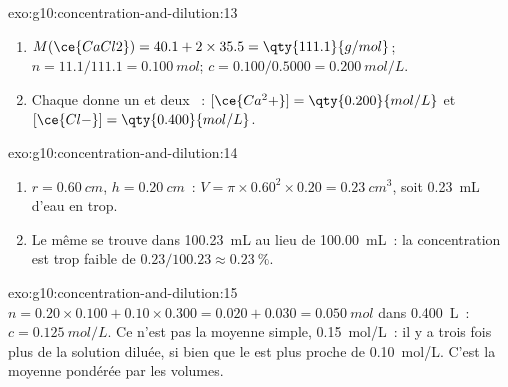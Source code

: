 \begin{solution}{exo:g10:concentration-and-dilution:13}
\begin{enumerate}
  \item $M(\ce{CaCl2}) = 40.1 + 2 \times 35.5 = \qty{111.1}{g/mol}$;
        $n = 11.1 / 111.1 = \qty{0.100}{mol}$; $c = 0.100 / 0.5000 =
        \qty{0.200}{mol/L}$.
  \item Chaque  donne un  et deux ~:
        $[\ce{Ca^2+}] = \qty{0.200}{mol/L}$ et $[\ce{Cl-}] =
        \qty{0.400}{mol/L}$.
\end{enumerate}
\end{solution}

\begin{solution}{exo:g10:concentration-and-dilution:14}
\begin{enumerate}
  \item $r = \qty{0.60}{cm}$, $h = \qty{0.20}{cm}$~:
        $V = \pi \times 0.60^2 \times 0.20 = \qty{0.23}{cm^3}$, soit
        \qty{0.23}{mL} d'eau en trop.
  \item Le même  se trouve dans \qty{100.23}{mL} au lieu de
        \qty{100.00}{mL}~: la concentration est trop faible de
        $0.23 / 100.23 \approx
        \qty{0.23}{\percent}$.
\end{enumerate}
\end{solution}

\begin{solution}{exo:g10:concentration-and-dilution:15}
$n = 0.20 \times 0.100 + 0.10 \times 0.300 = 0.020 + 0.030 =
\qty{0.050}{mol}$ dans \qty{0.400}{L}~: $c = \qty{0.125}{mol/L}$. Ce
n'est pas la moyenne simple, \qty{0.15}{mol/L}~: il y a trois fois plus
de la solution diluée, si bien que le  est plus proche de
\qty{0.10}{mol/L}. C'est la moyenne pondérée par les volumes.
\end{solution}

